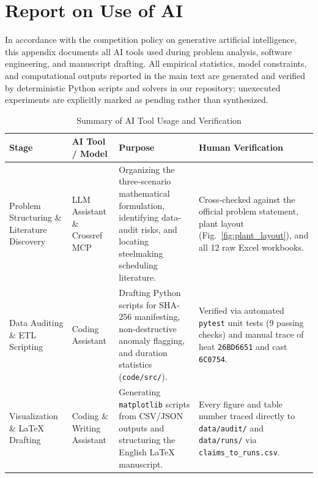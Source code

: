 \newpage
\appendix
\section*{Report on Use of AI}

In accordance with the competition policy on generative artificial intelligence, this appendix documents all AI tools used during problem analysis, software engineering, and manuscript drafting. All empirical statistics, model constraints, and computational outputs reported in the main text are generated and verified by deterministic Python scripts and solvers in our repository; unexecuted experiments are explicitly marked as pending rather than synthesized.

\begin{table}[htbp]
\centering
\caption{Summary of AI Tool Usage and Verification}
\begin{tabular}{p{3.2cm}p{3.4cm}p{4.5cm}p{4.2cm}}
\toprule
\textbf{Stage} & \textbf{AI Tool / Model} & \textbf{Purpose} & \textbf{Human Verification} \\
\midrule
Problem Structuring \& Literature Discovery & LLM Assistant \& Crossref MCP & Organizing the three-scenario mathematical formulation, identifying data-audit risks, and locating steelmaking scheduling literature. & Cross-checked against the official problem statement, plant layout (Fig.~\ref{fig:plant_layout}), and all 12 raw Excel workbooks. \\
Data Auditing \& ETL Scripting & Coding Assistant & Drafting Python scripts for SHA-256 manifesting, non-destructive anomaly flagging, and duration statistics (\texttt{code/src/}). & Verified via automated \texttt{pytest} unit tests (9 passing checks) and manual trace of heat \texttt{26BD6651} and cast \texttt{6C0754}. \\
Visualization \& LaTeX Drafting & Coding \& Writing Assistant & Generating \texttt{matplotlib} scripts from CSV/JSON outputs and structuring the English LaTeX manuscript. & Every figure and table number traced directly to \texttt{data/audit/} and \texttt{data/runs/} via \texttt{claims\_to\_runs.csv}. \\
\bottomrule
\end{tabular}
\end{table}
